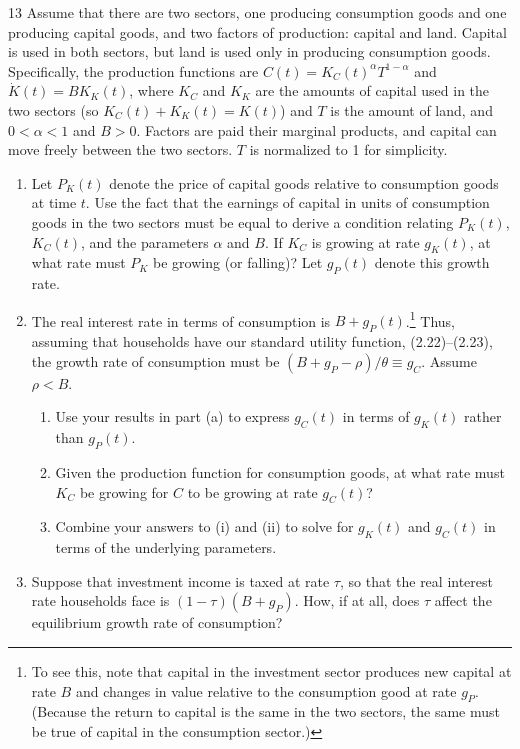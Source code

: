 \begin{problem}{13}
Assume that there are two sectors, one producing consumption goods and one producing capital goods, and two factors of production: capital and land. Capital is used in both sectors, but land is used only in producing consumption goods. Specifically, the production functions are \(C\left(t\right)=K_C\left(t\right)^\alpha T^{1-\alpha}\) and \(\dot{K}\left(t\right)=BK_K\left(t\right)\), where \(K_C\) and \(K_K\) are the amounts of capital used in the two sectors (so \(K_C\left(t\right)+K_K\left(t\right)=K\left(t\right)\)) and \(T\) is the amount of land, and \(0<\alpha<1\) and \(B>0\). Factors are paid their marginal products, and capital can move freely between the two sectors. \(T\) is normalized to 1 for simplicity.
\begin{enumerate}[label=(\alph*)]
    \item Let \(P_K\left(t\right)\) denote the price of capital goods relative to consumption goods at time \(t\). Use the fact that the earnings of capital in units of consumption goods in the two sectors must be equal to derive a condition relating \(P_K\left(t\right)\), \(K_C\left(t\right)\), and the parameters \(\alpha\) and \(B\). If \(K_C\) is growing at rate \(g_K\left(t\right)\), at what rate must \(P_K\) be growing (or falling)? Let \(g_P\left(t\right)\) denote this growth rate.
    \item The real interest rate in terms of consumption is \(B+g_P\left(t\right)\).\footnote{To see this, note that capital in the investment sector produces new capital at rate \(B\) and changes in value relative to the consumption good at rate \(g_P\). (Because the return to capital is the same in the two sectors, the same must be true of capital in the consumption sector.)} Thus, assuming that households have our standard utility function, (2.22)--(2.23), the growth rate of consumption must be \(\left(B+g_P-\rho\right)/\theta\equiv g_C\). Assume \(\rho<B\).
    \begin{enumerate}[label=(\roman*)]
        \item Use your results in part (a) to express \(g_C\left(t\right)\) in terms of \(g_K\left(t\right)\) rather than \(g_P\left(t\right)\).
        \item Given the production function for consumption goods, at what rate must \(K_C\) be growing for \(C\) to be growing at rate \(g_C\left(t\right)\)?
        \item Combine your answers to (i) and (ii) to solve for \(g_K\left(t\right)\) and \(g_C\left(t\right)\) in terms of the underlying parameters.
    \end{enumerate}
    \item Suppose that investment income is taxed at rate \(\tau\), so that the real interest rate households face is \(\left(1-\tau\right)\left(B+g_P\right)\). How, if at all, does \(\tau\) affect the equilibrium growth rate of consumption?
\end{enumerate}
\end{problem}

